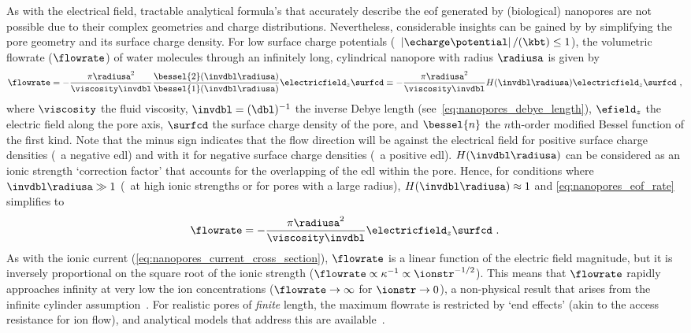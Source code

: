 As with the electrical field, tractable analytical formula's that accurately describe the \gls{eof} generated
by (biological) nanopores are not possible due to their complex geometries and charge distributions.
Nevertheless, considerable insights can be gained by by simplifying the pore geometry and its surface charge
density. For low surface charge potentials (\ie~$\left| \echarge \potential\right| / (\kbt) \le 1$), the
volumetric flowrate ($\flowrate$) of water molecules through an infinitely long, cylindrical nanopore with
radius $\radiusa$ is given by~\cite{Laohakunakorn-2015}
%
\begin{equation}\label{eq:nanopores_eof_rate}
  \flowrate = - \dfrac{\pi \radiusa^2}{\viscosity \invdbl} 
  \dfrac{ \bessel{2} ( \invdbl \radiusa ) }{ \bessel{1} (\invdbl \radiusa) }
  \electricfield_z \surfcd
  \equiv - \dfrac{\pi \radiusa^2}{\viscosity \invdbl} H(\invdbl \radiusa) \electricfield_z \surfcd
  \text{ ,}
\end{equation}
%
where $\viscosity$ the fluid viscosity, $\invdbl = (\dbl)^{-1}$ the inverse Debye length
(see~\cref{eq:nanopores_debye_length}), $\efield_z$ the electric field along the pore axis, $\surfcd$ the
surface charge density of the pore, and $\bessel{n}$ the $n$th-order modified Bessel function of the first
kind. Note that the minus sign indicates that the flow direction will be against the electrical field for
positive surface charge densities (\ie~a negative \gls{edl}) and with it for negative surface charge densities
(\ie~a positive \gls{edl}). $H(\invdbl \radiusa)$ can be considered as an ionic strength `correction factor'
that accounts for the overlapping of the \gls{edl} within the pore. Hence, for conditions where $\invdbl
\radiusa \gg 1$ (\eg~at high ionic strengths or for pores with a large radius), $H(\invdbl \radiusa) \approx
1$ and \cref{eq:nanopores_eof_rate} simplifies to
%
\begin{equation}\label{eq:nanopores_eof_rate_simple}
  \flowrate = - \dfrac{\pi \radiusa^2}{\viscosity \invdbl} \electricfield_z \surfcd
  \text{ .}
\end{equation}
%
As with the ionic current (\cref{eq:nanopores_current_cross_section}), $\flowrate$ is a linear function of the
electric field magnitude, but it is inversely proportional on the square root of the ionic strength
($\flowrate \propto \kappa^{-1} \propto \ionstr^{-1/2}$). This means that $\flowrate$ rapidly approaches
infinity at very low the ion concentrations  ($\flowrate \to \infty$ for $\ionstr \to 0$), a non-physical
result that arises from the infinite cylinder assumption~\cite{Mao-2014}. For realistic pores of \emph{finite}
length, the maximum flowrate is restricted by `end effects' (akin to the access resistance for ion flow), and
analytical models that address this are available~\cite{Sherwood-2014}.

